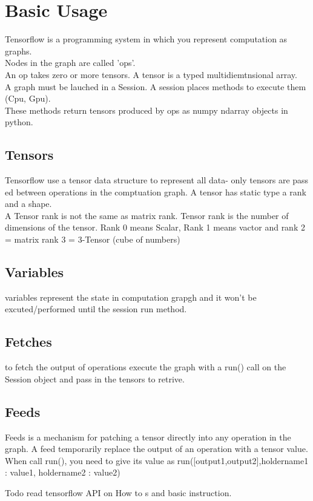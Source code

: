 \documentclass[twocolumn]{article}
\begin{document}
\section{Basic Usage}
Tensorflow is a programming system in which you represent computation as graphs.\\
Nodes in the graph are called 'ops'. \\
An op takes zero or more tensors.
A tensor is a typed multidiemtnsional array. \\
A graph must be lauched in a Session. A session places methods to execute them (Cpu, Gpu). \\
These methods return tensors produced by ops as numpy ndarray objects in python.

\subsection{Tensors}
Tensorflow use a tensor data structure to represent all data- only tensors are pass ed between  operations in the comptuation graph.
A tensor has static type a rank and a shape. \\
A Tensor rank is not the same as matrix rank. Tensor rank  is the number of dimensions of the tensor. Rank 0 means Scalar, Rank 1 means vactor and rank 2 = matrix rank 3 = 3-Tensor (cube of numbers)
\subsection{Variables}
variables represent the state in computation grapgh and it won't be excuted/performed until the session run method.

\subsection{Fetches}
to fetch the output of operations execute the graph with a run() call on the Session object and pass in the tensors to retrive.
\subsection{Feeds}
Feeds is a mechanism for patching a tensor directly into any operation in the graph.
A feed temporarily replace the output of an operation with a tensor value. When call run(), you need to give its value as run([output1,output2],{holdername1 : value1, holdername2 : value2})





Todo read tensorflow API on How to s and basic instruction.
\end{document}
